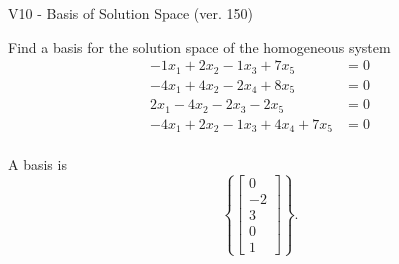 \begin{exercise}
  \begin{exerciseTitle}V10 - Basis of Solution Space (ver. 150)\end{exerciseTitle}
  \begin{exerciseStatement}
    Find a basis for the solution space of the homogeneous system 
\begin{align*}
 -1 x_ 1 + 2 x_ 2 -1 x_ 3 + 7 x_ 5 &= 0  \\ 
  -4 x_ 1 + 4 x_ 2 -2 x_ 4 + 8 x_ 5 &= 0  \\ 
  2 x_ 1 -4 x_ 2 -2 x_ 3 -2 x_ 5 &= 0  \\ 
  -4 x_ 1 + 2 x_ 2 -1 x_ 3 + 4 x_ 4 + 7 x_ 5 &= 0  \\ 
 \end{align*}


 
  \end{exerciseStatement}

  \begin{exerciseAnswer}
   A basis is   
\[\left\{\left[\begin{array}{c}
0 \\
-2 \\
3 \\
0 \\
1
\end{array}\right]\right\}.\]

  


  \end{exerciseAnswer}
\end{exercise}